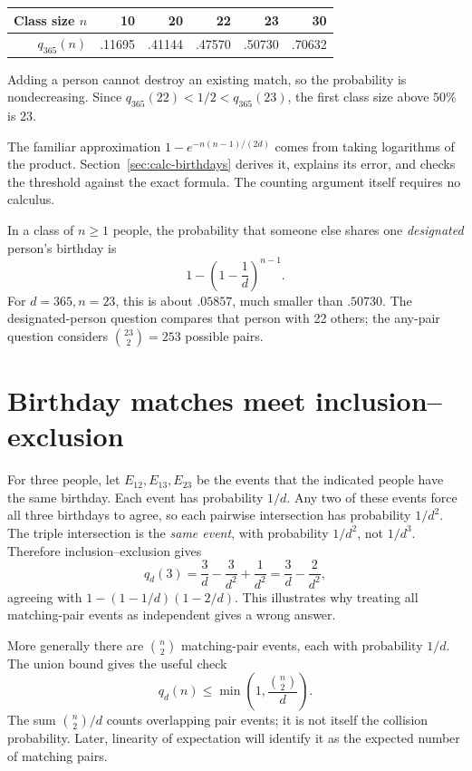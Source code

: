 \begin{center}
\begin{tabular}{@{}rrrrrr@{}}
\toprule
Class size $n$ & 10 & 20 & 22 & 23 & 30 \\
\midrule
$q_{365}(n)$ & .11695 & .41144 & .47570 & .50730 & .70632 \\
\bottomrule
\end{tabular}
\end{center}
Adding a person cannot destroy an existing match, so the probability is
nondecreasing. Since $q_{365}(22)<1/2<q_{365}(23)$, the first class size
above $50\%$ is $23$.

The familiar approximation $1-e^{-n(n-1)/(2d)}$ comes from taking
logarithms of the product. Section~\ref{sec:calc-birthdays} derives it,
explains its error, and checks the threshold against the exact formula.
The counting argument itself requires no calculus.

\begin{checkpoint}[title={Any pair versus one particular person}]
In a class of $n\ge1$ people, the probability that someone else shares one
\emph{designated} person's birthday is
\[
1-\left(1-\frac1d\right)^{n-1}.
\]
For $d=365,n=23$, this is about $.05857$, much smaller than $.50730$.
The designated-person question compares that person with 22 others;
the any-pair question considers $\binom{23}{2}=253$ possible pairs.
\end{checkpoint}

\section{Birthday matches meet inclusion--exclusion}

For three people, let $E_{12},E_{13},E_{23}$ be the events that the
indicated people have the same birthday. Each event has probability $1/d$.
Any two of these events force all three birthdays to agree, so each
pairwise intersection has probability $1/d^2$. The triple intersection
is the \emph{same event}, with probability $1/d^2$, not $1/d^3$.
Therefore inclusion--exclusion gives
\[
q_d(3)=\frac3d-\frac3{d^2}+\frac1{d^2}
       =\frac3d-\frac2{d^2},
\]
agreeing with $1-(1-1/d)(1-2/d)$. This illustrates why treating all
matching-pair events as independent gives a wrong answer.

More generally there are $\binom n2$ matching-pair events, each with
probability $1/d$. The union bound gives the useful check
\[
q_d(n)\le\min\!\left(1,\frac{\binom n2}{d}\right).
\]
The sum $\binom n2/d$ counts overlapping pair events; it is not itself
the collision probability. Later, linearity of expectation will identify
it as the expected number of matching pairs.

